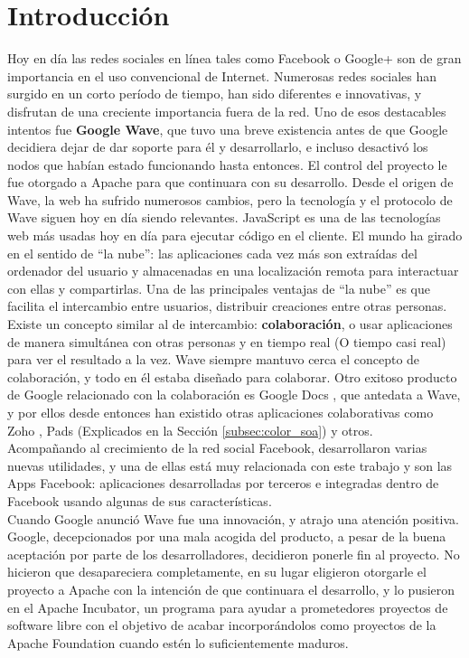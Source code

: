 \chapter{Introducción}
Hoy en día las redes sociales en línea tales como Facebook o Google+ son de gran importancia en el uso convencional de Internet. Numerosas redes sociales han surgido en un corto período de tiempo, han sido diferentes e innovativas, y disfrutan de una creciente importancia fuera de la red.
Uno de esos destacables intentos fue \textbf{Google Wave}, que tuvo una breve existencia antes de que Google decidiera dejar de dar soporte para él y desarrollarlo, e incluso desactivó los nodos que habían estado funcionando hasta entonces. El control del proyecto le fue otorgado a Apache para que continuara con su desarrollo. Desde el origen de Wave, la web ha sufrido numerosos cambios, pero la tecnología y el protocolo de Wave siguen hoy en día siendo relevantes. JavaScript es una de las tecnologías web más usadas hoy en día para ejecutar código en el cliente.
El mundo ha girado en el sentido de ``la nube'': las aplicaciones cada vez más son extraídas del ordenador del usuario y almacenadas en una localización remota para interactuar con ellas y compartirlas. Una de las principales ventajas de ``la nube'' es que facilita el intercambio entre usuarios, distribuir creaciones entre otras personas. Existe un concepto similar al de intercambio: \textbf{colaboración}, o usar aplicaciones de manera simultánea con otras personas y en tiempo real (O tiempo casi real) para ver el resultado a la vez. Wave siempre mantuvo cerca el concepto de colaboración, y todo en él estaba diseñado para colaborar. Otro exitoso producto de Google relacionado con la colaboración es Google Docs \cite{ref:google_docs}, que antedata a Wave, y por ellos desde entonces han existido otras aplicaciones colaborativas como Zoho \cite{ref:zoho}, Pads (Explicados en la Sección \ref{subsec:color_soa}) y otros.\\[.2cm]
Acompañando al crecimiento de la red social Facebook, desarrollaron varias nuevas utilidades, y una de ellas está muy relacionada con este trabajo y son las Apps Facebook: aplicaciones desarrolladas por terceros e integradas dentro de Facebook usando algunas de sus características.\\[.2cm]
Cuando Google anunció Wave fue una innovación, y atrajo una atención positiva. Google, decepcionados por una mala acogida del producto, a pesar de la buena aceptación por parte de los desarrolladores, decidieron ponerle fin al proyecto. No hicieron que desapareciera completamente, en su lugar eligieron otorgarle el proyecto a Apache con la intención de que continuara el desarrollo, y lo pusieron en el Apache Incubator, un programa para ayudar a prometedores proyectos de software libre con el objetivo de acabar incorporándolos como proyectos de la Apache Foundation cuando estén lo suficientemente maduros.\\[.2cm]

